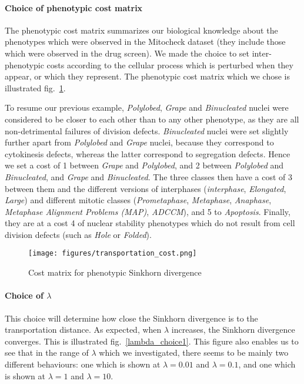 \paragraph*{Choice of phenotypic cost matrix\\}
The phenotypic cost matrix summarizes our biological knowledge about the phenotypes which were observed in the Mitocheck dataset (they include those which were observed in the drug screen). We made the choice to set inter-phenotypic costs according to the cellular process which is perturbed when they appear, or which they represent. The phenotypic cost matrix which we chose is illustrated fig.~\ref{cost}.

To resume our previous example, \textit{Polylobed}, \textit{Grape} and
\textit{Binucleated} nuclei were considered to be closer to each other
than to any other phenotype, as they are all non-detrimental failures
of division defects. \textit{Binucleated} nuclei were set slightly
further apart from \textit{Polylobed} and \textit{Grape} nuclei,
because they correspond to cytokinesis defects, whereas the latter
correspond to segregation defects. Hence we set a cost of 1 between \textit{Grape} and
\textit{Polylobed}, and 2 between \textit{Polylobed} and
\textit{Binucleated}, and \textit{Grape} and \textit{Binucleated}. The
three classes then have a cost of 3 between them and the different
versions of interphases (\textit{interphase}, \textit{Elongated},
\textit{Large}) and different mitotic classes (\textit{Prometaphase},
\textit{Metaphase}, \textit{Anaphase}, \textit{Metaphase Alignment
  Problems (MAP)}, \textit{ADCCM}), and 5 to \textit{Apoptosis}. Finally, they are at a
cost 4 of nuclear stability phenotypes which do not result from cell division
defects (such as \textit{Hole} or \textit{Folded}). 

\begin{figure*}[ht!]
\centerline{\texttt{[image: figures/transportation\_cost.png]}
}
\caption{Cost matrix for phenotypic Sinkhorn divergence}
\label{cost}
\end{figure*}

\paragraph*{Choice of $\lambda$\\} This choice will determine how close the Sinkhorn divergence is to the transportation distance. As expected, when $\lambda$ increases, the Sinkhorn divergence converges. This is illustrated fig.~\ref{lambda_choice1}. This figure also enables us to see that in the range of $\lambda$ which we investigated, there seems to be mainly two different behaviours: one which is shown at $\lambda=0.01$ and $\lambda=0.1$, and one which is shown at $\lambda=1$ and $\lambda=10$.

